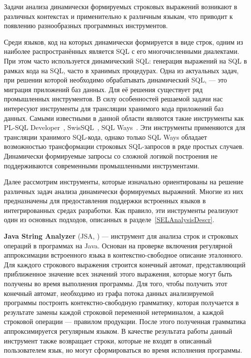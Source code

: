     Задачи анализа динамически формируемых строковых выражений возникают в различных контекстах и применительно к различным языкам, что приводит к появлению разнообразных программных инструментов.

    Среди языков, код на которых динамически формируется в виде строк, одним из наиболее распространённых является SQL с его многочисленными диалектами.  При этом часто используется динамический SQL: генерация выражений на SQL в рамках кода на SQL, часто в хранимых процедурах. Одна из актуальных задач, при решении которой необходимо обрабатывать динамический SQL, --- это миграция приложений баз данных. Для её решения существует ряд промышленных инструментов. В силу особенностей решаемой задачи нас интересуют инструменты для трансляции хранимого кода приложений баз данных. Самыми известными в данной области являются такие инструменты как PL-SQL Developer~\cite{PLSQLDeveloper}, SwisSQL~\cite{SwissSQL}, SQL Ways~\cite{SQLWays}. Эти инструменты применяются для трансляции хранимого SQL-кода, однако только SQL Ways обладает возможностью трансформации строковых SQL-запросов в ряде простых случаев. Динамически формируемые запросы со сложной логикой построения не поддерживаются современными промышленными инструментами.
    
    Далее рассмотрим инструменты, которые изначально ориентированы на решение различных задач анализа динамически формируемых выражений. Многие из них предназначены для предоставления поддержки встроенных языков в интегрированных средах разработки. Как правило, эти инструменты реализуют один из основных подходов, описанных в разделе~\ref{SELAnalysisDescr}.

\textbf{Java String Analyzer} (JSA, \cite{JSA, JSAUrl}) {---}  инструмент для анализа строк и строковых операций в программах на Java. Основан на проверке включения регулярной аппроксимации встроенного языка в контекстно-свободное описание эталонного. Для каждого строкового выражения строится конечный автомат, представляющий приближенное значение всех значений этого выражения, которые могут быть получены во время выполнения программы. Для того, чтобы получить этот конечный автомат, необходимо из графа потока данных анализируемой программы построить контекстно-свободную грамматику, которая получается в результате замены каждой строковой переменной нетерминалом, а каждой строковой операции {---} правилом продукции. После этого полученная грамматика аппроксимируется регулярным языком. В качестве результата работы данный инструмент также возвращает строки, которые не входят в описанный пользователем язык, но могут сформироваться во время исполнения программы. 

